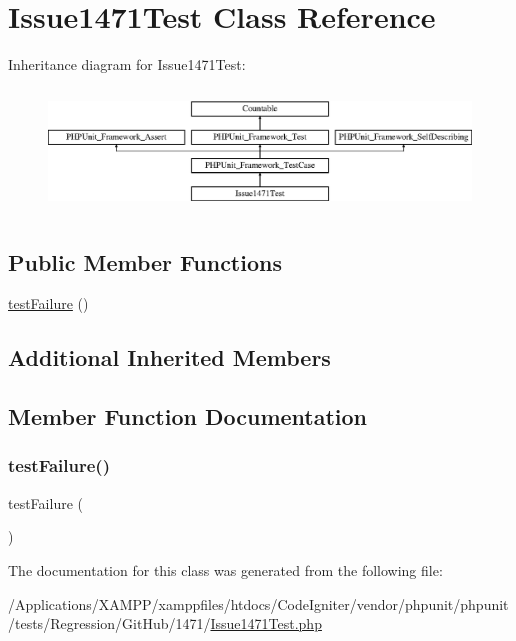 \hypertarget{class_issue1471_test}{}\section{Issue1471\+Test Class Reference}
\label{class_issue1471_test}
Inheritance diagram for Issue1471\+Test\+:\begin{figure}[H]
\begin{center}
\leavevmode
\includegraphics[height=3.303835cm]{class_issue1471_test}
\end{center}
\end{figure}
\subsection*{Public Member Functions}
\begin{DoxyCompactItemize}
\item 
\mbox{\hyperlink{class_issue1471_test_ab4995640dd47ccdf177deb72344da9e0}{test\+Failure}} ()
\end{DoxyCompactItemize}
\subsection*{Additional Inherited Members}


\subsection{Member Function Documentation}
\mbox{\label{class_issue1471_test_ab4995640dd47ccdf177deb72344da9e0}} 
\subsubsection{\texorpdfstring{test\+Failure()}{testFailure()}}
{\footnotesize\ttfamily test\+Failure (\begin{DoxyParamCaption}{ }\end{DoxyParamCaption})}



The documentation for this class was generated from the following file\+:\begin{DoxyCompactItemize}
\item 
/\+Applications/\+X\+A\+M\+P\+P/xamppfiles/htdocs/\+Code\+Igniter/vendor/phpunit/phpunit/tests/\+Regression/\+Git\+Hub/1471/\mbox{\hyperlink{_issue1471_test_8php}{Issue1471\+Test.\+php}}\end{DoxyCompactItemize}

